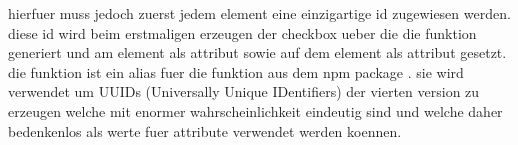 hierfuer muss jedoch zuerst jedem  element eine einzigartige id zugewiesen werden.
diese id wird beim erstmaligen erzeugen der checkbox ueber die die  funktion generiert und am  element als  attribut sowie auf dem  element als  attribut gesetzt.
die  funktion ist ein alias fuer die  funktion aus dem  npm package .
sie wird verwendet um UUIDs (Universally Unique IDentifiers) \parencite{UUIDRFC} der vierten version zu erzeugen welche mit enormer wahrscheinlichkeit eindeutig sind und welche daher bedenkenlos als werte fuer  attribute verwendet werden koennen.


